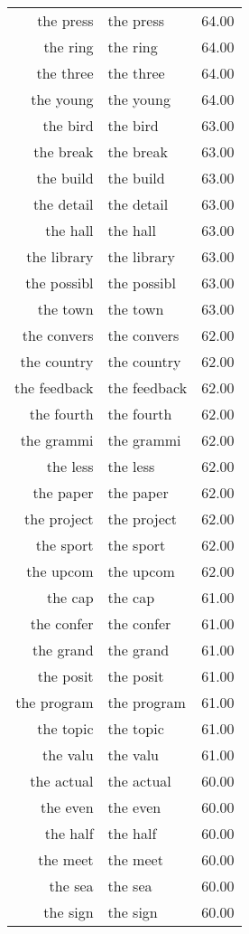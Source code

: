\begin{table}[ht]
\begin{tabular}{rlr}
  the press & the press & 64.00 \\ 
  the ring & the ring & 64.00 \\ 
  the three & the three & 64.00 \\ 
  the young & the young & 64.00 \\ 
  the bird & the bird & 63.00 \\ 
  the break & the break & 63.00 \\ 
  the build & the build & 63.00 \\ 
  the detail & the detail & 63.00 \\ 
  the hall & the hall & 63.00 \\ 
  the library & the library & 63.00 \\ 
  the possibl & the possibl & 63.00 \\ 
  the town & the town & 63.00 \\ 
  the convers & the convers & 62.00 \\ 
  the country & the country & 62.00 \\ 
  the feedback & the feedback & 62.00 \\ 
  the fourth & the fourth & 62.00 \\ 
  the grammi & the grammi & 62.00 \\ 
  the less & the less & 62.00 \\ 
  the paper & the paper & 62.00 \\ 
  the project & the project & 62.00 \\ 
  the sport & the sport & 62.00 \\ 
  the upcom & the upcom & 62.00 \\ 
  the cap & the cap & 61.00 \\ 
  the confer & the confer & 61.00 \\ 
  the grand & the grand & 61.00 \\ 
  the posit & the posit & 61.00 \\ 
  the program & the program & 61.00 \\ 
  the topic & the topic & 61.00 \\ 
  the valu & the valu & 61.00 \\ 
  the actual & the actual & 60.00 \\ 
  the even & the even & 60.00 \\ 
  the half & the half & 60.00 \\ 
  the meet & the meet & 60.00 \\ 
  the sea & the sea & 60.00 \\ 
  the sign & the sign & 60.00 \\ 

\end{tabular}
\end{table}
